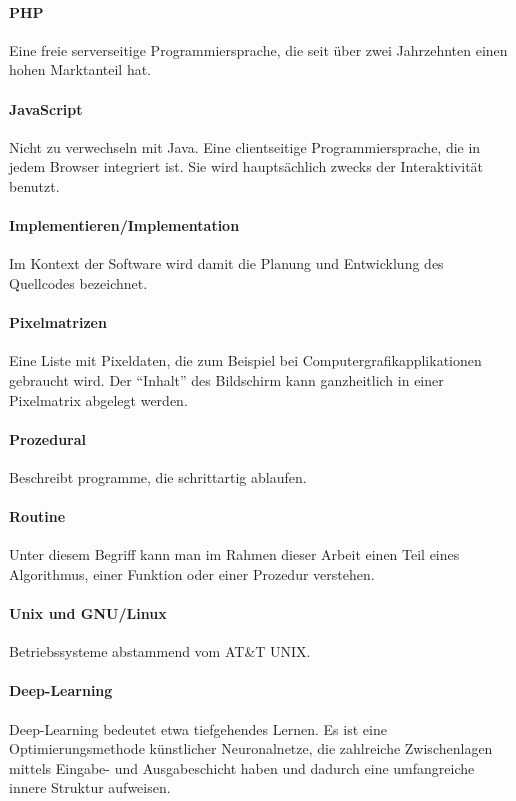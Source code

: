 \paragraph{PHP} Eine freie serverseitige Programmiersprache, die seit über zwei Jahrzehnten einen hohen Marktanteil hat.
\paragraph{JavaScript} Nicht zu verwechseln mit Java. Eine clientseitige Programmiersprache, die in jedem Browser integriert ist. Sie wird hauptsächlich zwecks der Interaktivität benutzt. 
\paragraph{Implementieren/Implementation} Im Kontext der Software wird damit die Planung und Entwicklung des Quellcodes bezeichnet.
\paragraph{Pixelmatrizen} Eine Liste mit Pixeldaten, die zum Beispiel bei Computergrafikapplikationen gebraucht wird. Der ``Inhalt'' des Bildschirm kann ganzheitlich in einer Pixelmatrix abgelegt werden.
\paragraph{Prozedural} Beschreibt programme, die schrittartig ablaufen.
\paragraph{Routine} Unter diesem Begriff kann man im Rahmen dieser Arbeit einen Teil eines Algorithmus, einer Funktion oder einer Prozedur verstehen.
\paragraph{Unix und GNU/Linux} Betriebssysteme abstammend vom AT\&T UNIX.
\paragraph{Deep-Learning} Deep-Learning bedeutet etwa tiefgehendes Lernen. Es ist eine Optimierungsmethode künstlicher Neuronalnetze, die zahlreiche Zwischenlagen mittels Eingabe- und Ausgabeschicht haben und dadurch eine umfangreiche innere Struktur aufweisen.
